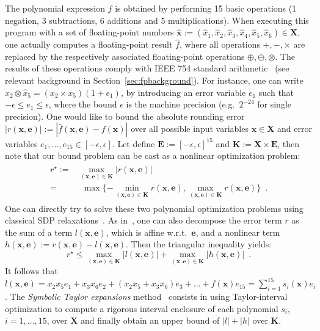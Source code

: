 \documentclass[preprint]{sigplanconf}
\newcommand{\x}{\mathbf{x}}
\newcommand{\e}{\mathbf{e}}
\def\E{\mathbf{E}}
\def\K{\mathbf{K}}
\def\X{\mathbf{X}}
\theoremstyle{plain}
\begin{document}
The polynomial expression $f$ is obtained by performing 15 basic operations (1 negation, 3 subtractions, 6 additions and 5 multiplications). 
When executing this program with a set of floating-point numbers $\hat{\x} :=  (\hat{x}_1, \hat{x}_2, \hat{x}_3, \hat{x}_4, \hat{x}_5, \hat{x}_6) \in \X$, one actually computes a floating-point result $\hat{f}$, where all operations $+, -, \times$ are replaced by the respectively associated floating-point operations $\oplus, \ominus, \otimes$. 
The results of these operations comply with IEEE 754 standard arithmetic~\cite{IEEE} (see relevant background in Section~\ref{sec:fpbackground}). For instance, one can write $\hat{x}_2 \otimes \hat{x}_5 =  (x_2 \times x_5) (1 + e_1)$, by introducing an error variable $e_1$ such that $-\epsilon \leq e_1 \leq \epsilon$, where the bound $\epsilon$ is the machine precision (e.g.~$2^{-24}$ for single precision). One would like to bound the absolute rounding error $|r(\x, \e)| := | \hat{f}(\x, \e) - f (\x) |$ over  all possible input variables $\x \in \X$ and error variables $e_1, \dots, e_{15} \in [-\epsilon, \epsilon]$. Let define $\E := [-\epsilon, \epsilon]^{15}$ and $\K := \X \times \E$, then note that our bound problem can be cast as a nonlinear optimization problem:
%
\begin{align}
\begin{split}
\label{eq:roptim}
r^\star := & \max_{(\x, \e) \in \K} | r(\x, \e) | \\
 = & \ \ \max \{-\min_{(\x, \e) \in \K} r(\x, \e), \max_{(\x, \e) \in \K} r(\x,\e)\} \enspace. 
\end{split}
\end{align}
%
One can directly try to solve these two polynomial optimization problems using classical SDP relaxations~\cite{Lasserre01moments}.
As in~\cite{fptaylor15}, one can also decompose the error term $r$ as the sum of a term $l(\x,\e)$, which is affine w.r.t.~$\e$, and a nonlinear term $h(\x,\e) := r(\x,\e) - l(\x,\e)$. Then the triangular inequality yields:
%
\begin{equation}
\label{eq:lhoptim} 
r^\star \leq \max_{(\x, \e) \in \K} |l(\x, \e)| + \max_{(\x, \e) \in \K} |h(\x, \e)| \enspace. 
\end{equation}
%
It follows that $l(\x,\e) = x_2 x_5 e_1 + x_3 x_6 e_2 +  (x_2 x_5 + x_3 x_6) e_3 + \dots + f(\x) e_{15} = \sum_{i=1}^{15} s_i(\x) e_i$. The {\em Symbolic Taylor expansions} method~\cite{fptaylor15} consists in using Taylor-interval optimization to compute a rigorous interval enclosure of each polynomial $s_i$, $i = 1,\dots,15$, over $\X$ and finally obtain an upper bound of $|l| + |h|$ over $\K$.
\end{document}
